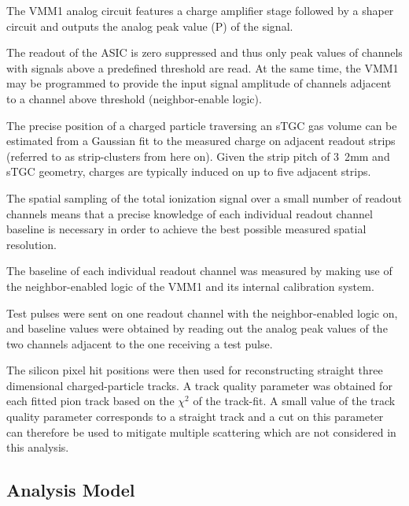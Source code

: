 The VMM1 analog circuit features a charge amplifier stage followed by a shaper circuit and outputs the analog peak value
(P) of the signal.\par
	
The readout of the ASIC is zero suppressed and thus only peak values of channels with signals above a predefined
threshold are read.  At the same time, the VMM1 may be programmed to provide the input signal amplitude of channels
adjacent to a channel above threshold (neighbor-enable logic).\par
	
The precise position of a charged particle traversing an sTGC gas volume can be estimated from a Gaussian fit to the
measured charge on adjacent readout strips (referred to as strip-clusters from here on). Given the strip pitch of
\unit{3.2}{mm} and sTGC geometry, charges are typically induced on up to five adjacent strips. \par

The spatial sampling of the total ionization signal over a small number of readout channels means that a precise
knowledge of each individual readout channel baseline is necessary in order to achieve the best possible measured
spatial resolution. \par

The baseline of each individual readout channel was measured by making use of the neighbor-enabled logic of the VMM1 and
its internal calibration system. \par

Test pulses were sent on one readout channel with the neighbor-enabled logic on, and baseline values were obtained by
reading out the analog peak values of the two channels adjacent to the one receiving a test pulse.\par
	
The silicon pixel hit positions were then used for reconstructing straight three dimensional charged-particle tracks.  A
track quality parameter was obtained for each fitted pion track based on the $\chi^2$ of the track-fit. A small value of
the track quality parameter corresponds to a straight track and a cut on this parameter can therefore be used to
mitigate multiple scattering which are not considered in this analysis.\par


\subsection{Analysis Model}


